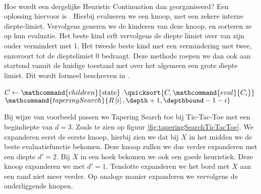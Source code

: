 \paragraph{}
Hoe wordt een dergelijke Heuristic Continuation dan georganiseerd? Een oplossing hiervoor is . Hierbij evalueren we een knoop, met een zekere interne diepte-limiet. Vervolgens generen we de kinderen van deze knoop, en sorteren ze op hun evaluatie. Het beste kind erft vervolgens de diepte limiet over van zijn ouder vermindert met 1. Het tweede beste kind met een vermindering met twee, enzovoort tot de dieptelimiet 0 bedraagt. Deze methode roepen we dan ook aan startend vanuit de huidige toestand met over het algemeen een grote diepte limiet. Dit wordt formeel beschreven in .
\begin{algorithm}[htb]                      %
\caption{$\mathcommand{taperingSearch}{\mbox{state},\depth,\depthbound}$}          %
\label{alg:taperingSearch}                           %
\begin{algorithmic}[1]                    %
\IF{$\depth<\depthbound$}
\STATE{}
\STATE $C\leftarrow\mathcommand{children}{\mbox{state}}$
\STATE $\quicksort{C,\mathcommand{eval}{C_i}}$
\STATE $\mathcommand{taperingSearch}{R\left[i\right],\depth+1,\depthbound-1-i}$
\ENDFOR
\ENDIF
\end{algorithmic}
\end{algorithm}
\begin{leftbar}
Bij wijze van voorbeeld passen we Tapering Search toe bij Tic-Tac-Toe met een begindiepte van $d=3$. Zoals te zien op figuur \ref{fig:taperingSearchTicTacToe}. We expanderen eerst de eerste knoop, hierbij zien we dat bij $X$ in het midden we de beste evaluatiefunctie bekomen. Deze knoop zullen we dus verder expanderen met een diepte $d'=2$. Bij $X$ in een hoek bekomen we ook een goede heuristiek. Deze knoop expanderen we met $d'=1$. Tenslotte expanderen we het bord met $X$ aan een rand niet meer verder. Op analoge manier expanderen we vervolgens de onderliggende knopen.
\end{leftbar}

